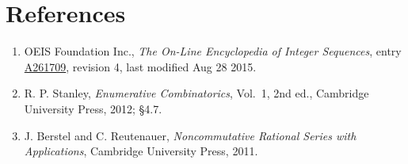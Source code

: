 \documentclass[11pt]{article}
\theoremstyle{definition}
\begin{document}
\section{References}

\begin{enumerate}

\item OEIS Foundation Inc., \emph{The On-Line Encyclopedia of Integer Sequences}, entry \href{https://oeis.org/A261709}{A261709}, revision 4, last modified Aug 28 2015.

\item R. P. Stanley, \emph{Enumerative Combinatorics}, Vol.~1, 2nd ed., Cambridge University Press, 2012; \S4.7.

\item J. Berstel and C. Reutenauer, \emph{Noncommutative Rational Series with Applications}, Cambridge University Press, 2011.

\end{enumerate}
\end{document}
